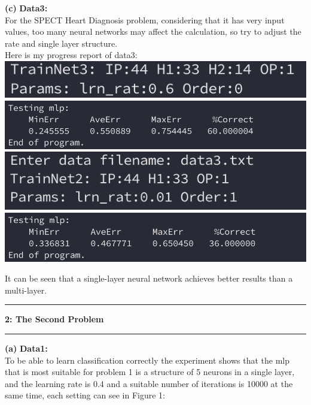 \documentclass[11pt]{article}
\newcommand\question[2]{\vspace{.25in}\hrule\textbf{#1: #2}\vspace{.5em}\hrule\vspace{.10in}}
\renewcommand\part[1]{\vspace{.10in}\textbf{(#1)}}
\newcommand\one{\vspace{.10in}\textbf{Data1: }}
\newcommand\three{\vspace{.10in}\textbf{Data3: }}
\begin{document}
\part{c} \three\\
For the SPECT Heart Diagnosis problem, considering that it has very input values, too many neural networks may affect the calculation, so try to adjust the rate and single layer structure.\\
Here is my progress report of data3:\\
\includegraphics[scale=1]{3-in1.png}
\includegraphics[scale=0.8]{3-ot1.png}
\includegraphics[scale=1]{3-in2.png}
\includegraphics[scale=0.8]{3-ot2.png}

It can be seen that a single-layer neural network achieves better results than a multi-layer.


\question{2}{The Second Problem}

\part{a} \one\\
To be able to learn classification correctly the experiment shows that the mlp that is most suitable for problem 1 is a structure of 5 neurons in a single layer, and the learning rate is 0.4 and a suitable number of iterations is 10000 at the same time, each setting can see in Figure 1:\\
\end{document}
